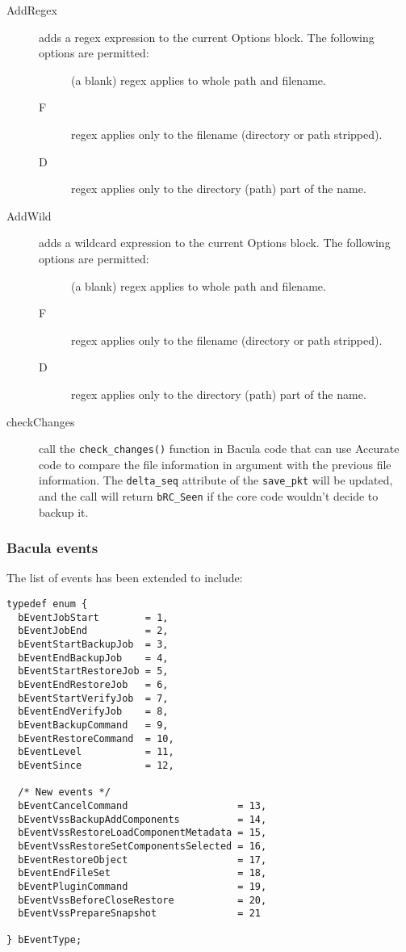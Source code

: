 \begin{description}
\item [AddRegex] adds a regex expression to the current Options block.
  The following options are permitted:
  \begin{description}
  \item [ ] (a blank) regex applies to whole path and filename.
  \item [F] regex applies only to the filename (directory or path stripped).
  \item [D] regex applies only to the directory (path) part of the name.
  \end{description}

\item [AddWild] adds a wildcard expression to the current Options block.
  The following options are permitted:
  \begin{description}
  \item [ ] (a blank) regex applies to whole path and filename.
  \item [F] regex applies only to the filename (directory or path stripped).
  \item [D] regex applies only to the directory (path) part of the name.
  \end{description}

\item [checkChanges] call the \texttt{check\_changes()} function in Bacula code
  that can use Accurate code to compare the file information in argument with
  the previous file information. The \texttt{delta\_seq} attribute of the
  \texttt{save\_pkt} will be updated, and the call will return
  \texttt{bRC\_Seen} if the core code wouldn't decide to backup it.
  
\end{description}
  

\subsubsection{Bacula events}
The list of events has been extended to include:

\begin{verbatim}
typedef enum {
  bEventJobStart        = 1,
  bEventJobEnd          = 2,
  bEventStartBackupJob  = 3,
  bEventEndBackupJob    = 4,
  bEventStartRestoreJob = 5,
  bEventEndRestoreJob   = 6,
  bEventStartVerifyJob  = 7,
  bEventEndVerifyJob    = 8,
  bEventBackupCommand   = 9,
  bEventRestoreCommand  = 10,
  bEventLevel           = 11,
  bEventSince           = 12,
   
  /* New events */
  bEventCancelCommand                   = 13,
  bEventVssBackupAddComponents          = 14,
  bEventVssRestoreLoadComponentMetadata = 15,
  bEventVssRestoreSetComponentsSelected = 16,
  bEventRestoreObject                   = 17,
  bEventEndFileSet                      = 18,
  bEventPluginCommand                   = 19,
  bEventVssBeforeCloseRestore           = 20,
  bEventVssPrepareSnapshot              = 21

} bEventType;
\end{verbatim}

